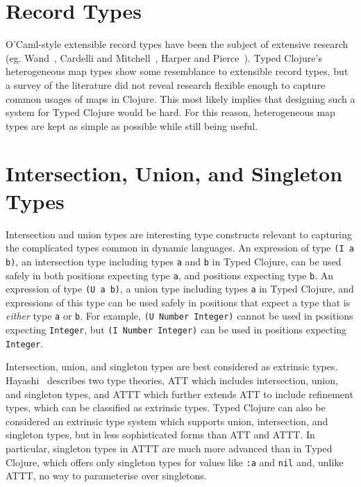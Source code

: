 \section{Record Types}
\label{sec:recordtypes}

O'Caml-style extensible record types have been the subject of extensive research 
(eg. Wand~\cite{Wan89}, Cardelli and Mitchell~\cite{CM91}, Harper and Pierce~\cite{HP91}).
Typed Clojure's heterogeneous map types show some resemblance to extensible
record types, but a survey of the literature did not reveal research flexible
enough to capture common usages of maps in Clojure.
This most likely implies that designing such a system for Typed Clojure would be hard.
For this reason, heterogeneous map types are kept as simple as possible while still being useful.

\section{Intersection, Union, and Singleton Types}
\label{sec:intersectionunion}

Intersection and union types are interesting type constructs relevant to capturing the complicated
types common in dynamic languages.
An expression of type \lstinline|(I a b)|, an intersection type including types \lstinline|a|
and \lstinline|b| in Typed Clojure, can be used safely in both positions expecting type \lstinline|a|,
and positions expecting type \lstinline|b|.
An expression of type \lstinline|(U a b)|, a union type including types \lstinline|a| in Typed Clojure,
and expressions of this type can be used safely in positions 
that expect a type that is \emph{either} type \lstinline|a|
or \lstinline|b|.
For example, \lstinline|(U Number Integer)| cannot be used in positions expecting \lstinline|Integer|,
but \lstinline|(I Number Integer)| can be used in positions expecting \lstinline|Integer|.

Intersection, union, and singleton types are best considered as extrinsic types.
Hayashi~\cite{Hay91} describes two type theories, ATT which includes
intersection, union, and singleton types, and ATTT which further extends ATT
to include refinement types, which can be classified as extrinsic types.
Typed Clojure can also be considered an extrinsic type system which supports
union, intersection, and singleton types, but in less sophisticated forms
than ATT and ATTT.
In particular, singleton types in ATTT are much more advanced than in Typed Clojure,
which offers only singleton types for values like \lstinline|:a| and \lstinline|nil|
and, unlike ATTT, no way to parameterise over singletons.

